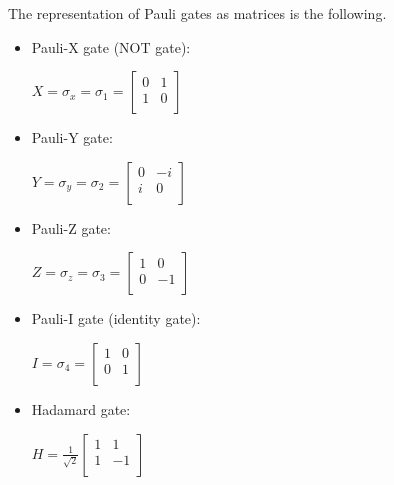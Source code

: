 \documentclass[inscr,ack,preface]{diphdthesis}
\begin{document}
The representation of Pauli gates as matrices is the following.\cite{niel}
\begin{itemize}
    \item Pauli-X gate (NOT gate):
    \begin{center}
    \Large
        $X = \sigma_x = \sigma_1 = 
        \begin{bmatrix}
            0 & 1 \\
            1 & 0 \\
        \end{bmatrix}$
    \end{center}
    \normalsize
    \item Pauli-Y gate:
    \begin{center}
    \Large
        $Y = \sigma_y = \sigma_2 = 
        \begin{bmatrix}
            0 & -i \\
            i & 0 \\
        \end{bmatrix}$
    \end{center}
    \normalsize
    \item Pauli-Z gate:
    \begin{center}
    \Large
        $Z = \sigma_z = \sigma_3 = 
        \begin{bmatrix}
            1 & 0 \\
            0 & -1 \\
        \end{bmatrix}$
    \end{center}
    \normalsize
    \item Pauli-I gate (identity gate):
    \begin{center}
    \Large
        $I =  \sigma_4 = 
        \begin{bmatrix}
            1 & 0 \\
            0 & 1 \\
        \end{bmatrix}$
    \end{center}
    \item Hadamard gate:
    \begin{center}
    \Large
        $H = \frac{1}{\sqrt{2}}\begin{bmatrix}
            1 & 1 \\
            1 & -1 \\
            \end{bmatrix}$
    \end{center}
    
\end{itemize}
\end{document}
